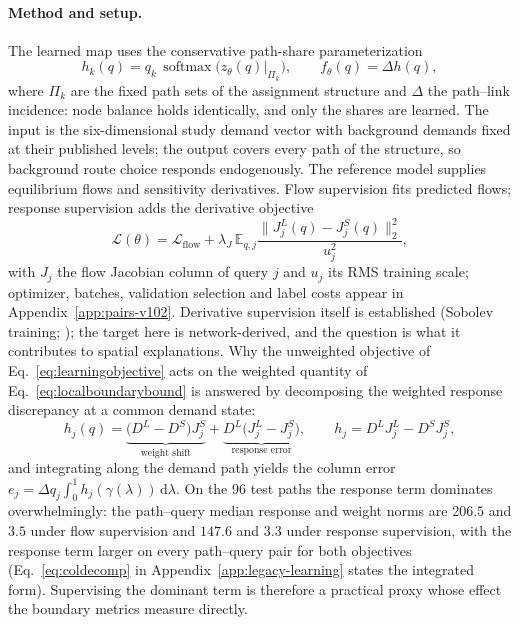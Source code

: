 \documentclass[a4paper,fleqn]{cas-sc}
\newcommand{\E}{\mathbb{E}}
\newcommand{\norm}[1]{\lVert #1 \rVert}
\begin{document}
\paragraph{Method and setup.}
The learned map uses the conservative path-share parameterization
\begin{equation}
h_k(q)=q_k\,\operatorname{softmax}\bigl(z_\theta(q)\bigr|_{\Pi_k}\bigr),
\qquad f_\theta(q)=\Delta h(q),
\label{eq:consparam}
\end{equation}
where $\Pi_k$ are the fixed path sets of the assignment structure and
$\Delta$ the path--link incidence: node balance holds identically, and
only the shares are learned. The input is the six-dimensional study
demand vector with background demands fixed at their published levels;
the output covers every path of the structure, so background route
choice responds endogenously. The reference model supplies equilibrium
flows and sensitivity derivatives. Flow supervision fits predicted
flows; response supervision adds the derivative objective
\begin{equation}
\mathcal L(\theta)=\mathcal L_{\mathrm{flow}}
+\lambda_J\,\E_{q,j}\frac{\norm{J_j^L(q)-J_j^S(q)}_2^2}{u_j^2},
\label{eq:learningobjective}
\end{equation}
with $J_j$ the flow Jacobian column of query $j$ and $u_j$ its RMS
training scale; optimizer, batches, validation selection and label
costs appear in Appendix~\ref{app:pairs-v102}. Derivative supervision
itself is established (Sobolev training;
\citealp{czarnecki2017sobolev,yuan2022sobolev}); the target here is
network-derived, and the question is what it contributes to spatial
explanations.
Why the unweighted objective of Eq.~\eqref{eq:learningobjective} acts
on the weighted quantity of Eq.~\eqref{eq:localboundarybound} is
answered by decomposing the weighted response discrepancy at a common
demand state:
\begin{equation}
h_j(q)=\underbrace{\bigl(D^L-D^S\bigr)J_j^S}_{\text{weight shift}}
+\underbrace{D^L\bigl(J_j^L-J_j^S\bigr)}_{\text{response error}},
\qquad h_j=D^LJ_j^L-D^SJ_j^S,
\label{eq:coldecompmain}
\end{equation}
and integrating along the demand path yields the column error
$e_j=\Delta q_j\int_0^1h_j(\gamma(\lambda))\,\mathrm{d}\lambda$. On the
96 test paths the response term dominates overwhelmingly: the
path--query median response and weight norms are $206.5$ and $3.5$
under flow supervision and $147.6$ and $3.3$ under response
supervision, with the response term larger on every path--query pair
for both objectives (Eq.~\eqref{eq:coldecomp} in
Appendix~\ref{app:legacy-learning} states the integrated form).
Supervising the dominant term is therefore a
practical proxy whose effect the boundary metrics measure directly.
\end{document}
